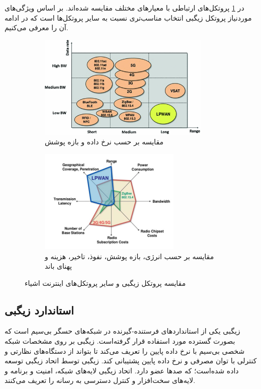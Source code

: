 در \cref{fig:protocol_comp} پروتکل‌های ارتباطی با معیارهای مختلف مقایسه شده‌اند. بر اساس ویژگی‌های موردنیاز پروتکل زیگبی انتخاب مناسب‌تری نسبت به سایر پروتکل‌ها است که در ادامه آن را معرفی می‌کنیم.

\begin{figure}
\centering
\begin{subfigure}{.5\textwidth}
  \centering
  \includegraphics[height=5cm, width=.9\linewidth]{protocol_data_range.png}
    \centering
  \caption{مقایسه بر حسب نرخ داده و بازه پوشش \cite{carlsson2018measuring}}
\end{subfigure}%
\begin{subfigure}{.5\textwidth}
  \centering
  \includegraphics[height=5cm, width=.9\linewidth]{protocol_m_criteria.png}
    \centering
  \caption{مقایسه بر حسب انرژی، بازه پوشش، نفو‌ذ، تاخیر، هزینه و پهنای باند \cite{tabbane2017iot}}
\end{subfigure}
\caption{مقایسه پروتکل زیگبی و سایر پروتکل‌های اینترنت اشیاء}
\label{fig:protocol_comp}
\end{figure}

\subsection{استاندارد زیگبی}

زیگبی یکی از استانداردهای فرستنده-گیرنده در شبکه‌های حسگر بی‌سیم است که بصورت گسترده مورد استفاده قرار گرفته‌است. زیگبی بر روی  مشخصات شبکه شخصی بی‌سیم با نرخ داده پایین را تعریف می‌کند تا بتواند از دستگاه‌های نظارتی و کنترلی با توان مصرفی و نرخ داده پایین پشتیبانی کند. زیگبی توسط اتحاد زیگبی توسعه داده شده‌است؛ که صدها عضو دارد. اتحاد زیگبی لایه‌های شبکه، امنیت و برنامه و  لایه‌های سخت‌افزار و کنترل دسترسی به رسانه را تعریف می‌کنند\cite{ramya2011study}.

